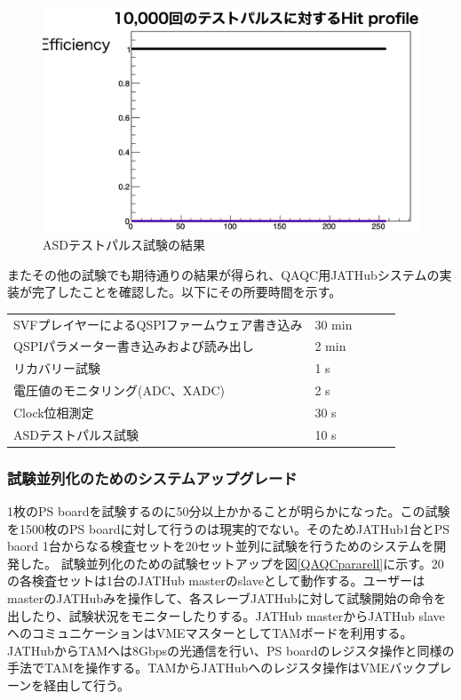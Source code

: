 \begin{figure} 
\centering
\includegraphics[width=16cm]{fig/QAQC/QAQCresult.png}
\caption[ASDテストパルスの結果]{ASDテストパルス試験の結果}
\label{QAQCresult}
\end{figure}

またその他の試験でも期待通りの結果が得られ、QAQC用JATHubシステムの実装が完了したことを確認した。以下にその所要時間を示す。

\begin{table}[]
    \begin{tabular}{lllll}
    SVFプレイヤーによるQSPIファームウェア書き込み    & 30 min &  &  &  \\
    QSPIパラメーター書き込みおよび読み出し         & 2 min  &  &  &  \\
    リカバリー試験                       & 1 s    &  &  &  \\
    電圧値のモニタリング(ADC、XADC) & 2 s    &  &  &  \\
    Clock位相測定                     & 30 s   &  &  &  \\
    ASDテストパルス試験                   & 10 s   &  &  & 
    \end{tabular}
\end{table}

\subsubsection{試験並列化のためのシステムアップグレード}
\label{subsubsec_parallel}
1枚のPS boardを試験するのに50分以上かかることが明らかになった。この試験を1500枚のPS boardに対して行うのは現実的でない。そのためJATHub1台とPS baord 1台からなる検査セットを20セット並列に試験を行うためのシステムを開発した。
試験並列化のための試験セットアップを図\ref{QAQCpararell}に示す。20の各検査セットは1台のJATHub masterのslaveとして動作する。ユーザーはmasterのJATHubみを操作して、各スレーブJATHubに対して試験開始の命令を出したり、試験状況をモニターしたりする。JATHub masterからJATHub slaveへのコミュニケーションはVMEマスターとしてTAMボードを利用する。JATHubからTAMへは8Gbpsの光通信を行い、PS boardのレジスタ操作と同様の手法でTAMを操作する。TAMからJATHubへのレジスタ操作はVMEバックプレーンを経由して行う。

